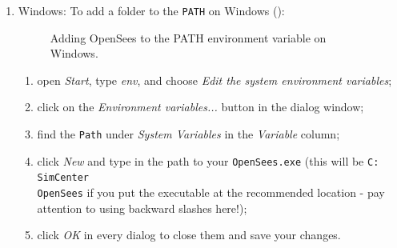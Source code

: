 \begin{enumerate}
\item Windows: To add a folder to the \texttt{PATH} on Windows ():

\begin{figure}[!htbp]
  \caption{Adding OpenSees to the PATH environment variable on Windows.}
  \label{fig:add_env_path}
\end{figure}

\begin{enumerate}
    \item open \emph{Start}, type \emph{env}, and choose \emph{Edit the system environment variables};
    \item click on the \emph{Environment variables...} button in the dialog window;
    \item find the \texttt{Path} under \emph{System Variables} in the \emph{Variable} column;
    \item click \emph{New} and type in the path to your \texttt{OpenSees.exe} (this will be \texttt{C:\\SimCenter\\OpenSees} if you put the executable at the recommended location - pay attention to using backward slashes here!);
    \item click \emph{OK} in every dialog to close them and save your changes.
\end{enumerate}


\end{enumerate}
